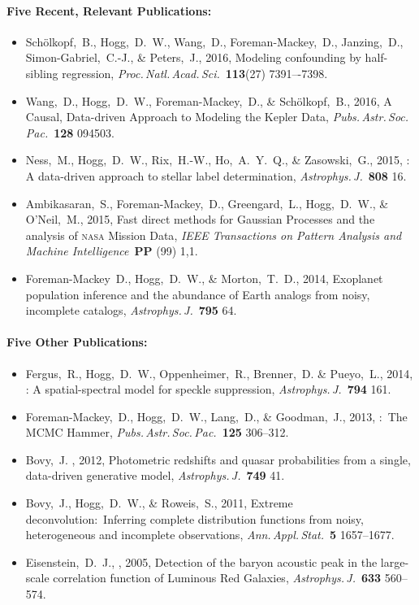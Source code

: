 \documentclass[letterpaper,12pt]{article}
\begin{document}
\paragraph{Five Recent, Relevant Publications:}
\begin{itemize}\setlength{\itemsep}{0pt}
\item
Sch\"olkopf,~B., Hogg,~D.~W., Wang,~D., Foreman-Mackey,~D., Janzing,~D., Simon-Gabriel,~C.-J., \& Peters,~J., 2016,
{Modeling confounding by half-sibling regression},
\textit{Proc.\,Natl.\,Acad.\,Sci.}\ \textbf{113}(27) 7391–-7398.
\item
Wang,~D., Hogg,~D.~W., Foreman-Mackey,~D., \& Sch\"olkopf,~B., 2016,
{A Causal, Data-driven Approach to Modeling the Kepler Data},
\textit{Pubs.\,Astr.\,Soc.\,Pac.}\ \textbf{128} 094503.
\item
Ness,~M., Hogg,~D.~W., Rix,~H.-W., Ho,~A.~Y.~Q., \& Zasowski,~G., 2015,
{: A data-driven
approach to stellar label determination},
\textit{Astrophys.\,J.}\ \textbf{808} 16.
\item
Ambikasaran,~S., Foreman-Mackey,~D., Greengard,~L., Hogg,~D.~W., \& O'Neil,~M., 2015,
{Fast direct methods for Gaussian Processes and the analysis of \textsc{nasa}  Mission Data},
\textit{IEEE Transactions on Pattern Analysis and Machine Intelligence}\ \textbf{PP} (99) 1,1.
\item
Foreman-Mackey~D., Hogg,~D.~W., \& Morton,~T.~D., 2014,
{Exoplanet population inference and the abundance of Earth analogs from noisy, incomplete catalogs},
\textit{Astrophys.\,J.}\ \textbf{795} 64.
\end{itemize}

\paragraph{Five Other Publications:}
\begin{itemize}\setlength{\itemsep}{0pt}
\item
Fergus,~R., Hogg,~D.~W., Oppenheimer,~R., Brenner,~D. \& Pueyo,~L., 2014,
{: A spatial-spectral model for speckle suppression},
\textit{Astrophys.\,J.}\ \textbf{794} 161.
\item
Foreman-Mackey,~D., Hogg,~D.~W., Lang,~D., \& Goodman,~J., 2013,
{:\ The MCMC Hammer},
\textit{Pubs.\,Astr.\,Soc.\,Pac.}\ \textbf{125} 306--312.
\item
Bovy,~J. \etal, 2012,
{Photometric redshifts and quasar probabilities from a single, data-driven generative model},
\textit{Astrophys.\,J.}\ \textbf{749} 41.
\item
Bovy,~J., Hogg,~D.~W., \& Roweis,~S., 2011,
{Extreme deconvolution:\ Inferring complete distribution functions from noisy, heterogeneous and incomplete observations},
\textit{Ann.\,Appl.\,Stat.}\ \textbf{5} 1657--1677.
\item
Eisenstein,~D.~J., \etal, 2005,
{Detection of the baryon acoustic peak in the large-scale correlation function of  Luminous Red Galaxies},
\textit{Astrophys.\,J.}\ \textbf{633} 560--574.
\end{itemize}
\end{document}
